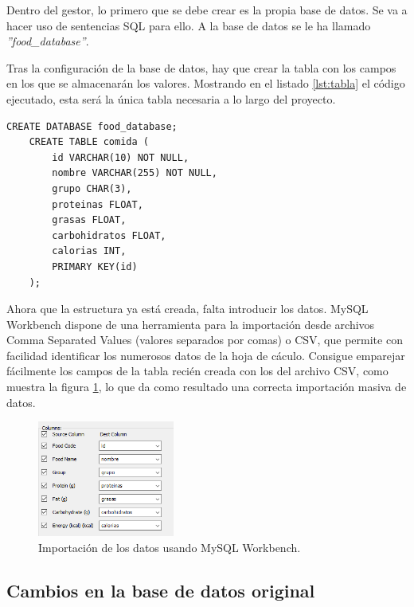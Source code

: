 Dentro del gestor, lo primero que se debe crear es la propia base de datos. Se va a hacer uso de sentencias SQL para ello. A la base de datos se le ha llamado \textit{''food\_database''}.

\newpage

Tras la configuración de la base de datos, hay que crear la tabla con los campos en los que se almacenarán los valores. Mostrando en el listado \ref{lst:tabla} el código ejecutado, esta será la única tabla necesaria a lo largo del proyecto.

\begin{lstlisting}[style=sqlstyle, caption=Creación de la tabla y sus campos., label={lst:tabla}]
    CREATE DATABASE food_database;
    CREATE TABLE comida (
        id VARCHAR(10) NOT NULL,
        nombre VARCHAR(255) NOT NULL,
        grupo CHAR(3),
        proteinas FLOAT,
        grasas FLOAT,
        carbohidratos FLOAT,
        calorias INT,
        PRIMARY KEY(id)
    );
\end{lstlisting}

Ahora que la estructura ya está creada, falta introducir los datos. MySQL Workbench dispone de una herramienta para la importación desde archivos Comma Separated Values (valores separados por comas) o CSV, que permite con facilidad identificar los numerosos datos de la hoja de cáculo. Consigue emparejar fácilmente los campos de la tabla recién creada con los del archivo CSV, como muestra la figura \ref{fig:importacion}, lo que da como resultado una correcta importación masiva de datos.

\begin{figure}[H]
    \centering
    \includegraphics[width=0.4\textwidth]{figures/importacion.png}
    \caption{Importación de los datos usando MySQL Workbench.}
    \label{fig:importacion}
\end{figure}

\subsection{Cambios en la base de datos original}

